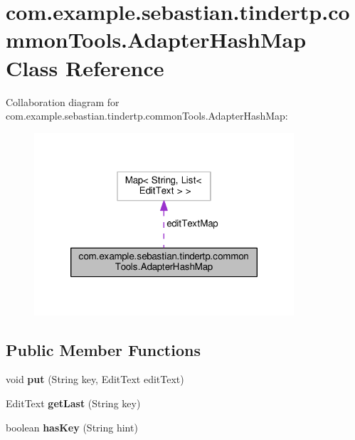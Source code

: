 \hypertarget{classcom_1_1example_1_1sebastian_1_1tindertp_1_1commonTools_1_1AdapterHashMap}{}\section{com.\+example.\+sebastian.\+tindertp.\+common\+Tools.\+Adapter\+Hash\+Map Class Reference}
\label{classcom_1_1example_1_1sebastian_1_1tindertp_1_1commonTools_1_1AdapterHashMap}


Collaboration diagram for com.\+example.\+sebastian.\+tindertp.\+common\+Tools.\+Adapter\+Hash\+Map\+:
\nopagebreak
\begin{figure}[H]
\begin{center}
\leavevmode
\includegraphics[width=274pt]{classcom_1_1example_1_1sebastian_1_1tindertp_1_1commonTools_1_1AdapterHashMap__coll__graph}
\end{center}
\end{figure}
\subsection*{Public Member Functions}
\begin{DoxyCompactItemize}
\item 
void {\bfseries put} (String key, Edit\+Text edit\+Text)\hypertarget{classcom_1_1example_1_1sebastian_1_1tindertp_1_1commonTools_1_1AdapterHashMap_abda652f6e808424025b76b6e056d0fdc}{}\label{classcom_1_1example_1_1sebastian_1_1tindertp_1_1commonTools_1_1AdapterHashMap_abda652f6e808424025b76b6e056d0fdc}

\item 
Edit\+Text {\bfseries get\+Last} (String key)\hypertarget{classcom_1_1example_1_1sebastian_1_1tindertp_1_1commonTools_1_1AdapterHashMap_a01ef025e335df8235f471b607df875c4}{}\label{classcom_1_1example_1_1sebastian_1_1tindertp_1_1commonTools_1_1AdapterHashMap_a01ef025e335df8235f471b607df875c4}

\item 
boolean {\bfseries has\+Key} (String hint)\hypertarget{classcom_1_1example_1_1sebastian_1_1tindertp_1_1commonTools_1_1AdapterHashMap_a18dff318b398a1f958316a2416ea63d5}{}\label{classcom_1_1example_1_1sebastian_1_1tindertp_1_1commonTools_1_1AdapterHashMap_a18dff318b398a1f958316a2416ea63d5}

\end{DoxyCompactItemize}
